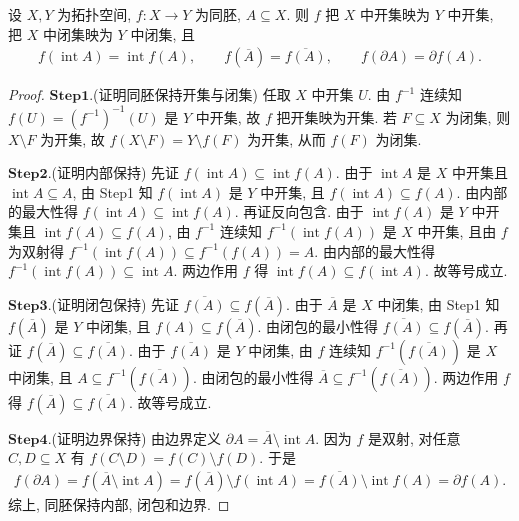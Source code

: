 \documentclass[../../main.tex]{subfiles}%
\begin{document}
\begin{theorem}\label{theorem:同胚保持集合内点闭包边界}
设 \(X,Y\) 为拓扑空间, \(f:X\to Y\) 为同胚, \(A\subseteq X\). 则 \(f\) 把 \(X\) 中开集映为 \(Y\) 中开集, 把 \(X\) 中闭集映为 \(Y\) 中闭集, 且
\begin{align*}
f(\operatorname{int}A)=\operatorname{int}f(A),\qquad
f(\overline A)=\overline{f(A)},\qquad
f(\partial A)=\partial f(A).
\end{align*}
\end{theorem}
\begin{proof}
\noindent$\mathbf{Step}\bm{1}.${\heiti (证明同胚保持开集与闭集)}
任取 \(X\) 中开集 \(U\). 由 \(f^{-1}\) 连续知 \(f(U)=(f^{-1})^{-1}(U)\) 是 \(Y\) 中开集, 故 \(f\) 把开集映为开集. 若 \(F\subseteq X\) 为闭集, 则 \(X\setminus F\) 为开集, 故 \(f(X\setminus F)=Y\setminus f(F)\) 为开集, 从而 \(f(F)\) 为闭集.

\noindent$\mathbf{Step}\bm{2}.${\heiti (证明内部保持)}
先证 \(f(\operatorname{int}A)\subseteq\operatorname{int}f(A)\). 由于 \(\operatorname{int}A\) 是 \(X\) 中开集且 \(\operatorname{int}A\subseteq A\), 由 Step1 知 \(f(\operatorname{int}A)\) 是 \(Y\) 中开集, 且 \(f(\operatorname{int}A)\subseteq f(A)\). 由内部的最大性得 \(f(\operatorname{int}A)\subseteq\operatorname{int}f(A)\). 再证反向包含. 由于 \(\operatorname{int}f(A)\) 是 \(Y\) 中开集且 \(\operatorname{int}f(A)\subseteq f(A)\), 由 \(f^{-1}\) 连续知 \(f^{-1}(\operatorname{int}f(A))\) 是 \(X\) 中开集, 且由 \(f\) 为双射得 \(f^{-1}(\operatorname{int}f(A))\subseteq f^{-1}(f(A))=A\). 由内部的最大性得 \(f^{-1}(\operatorname{int}f(A))\subseteq\operatorname{int}A\). 两边作用 \(f\) 得 \(\operatorname{int}f(A)\subseteq f(\operatorname{int}A)\). 故等号成立.

\noindent$\mathbf{Step}\bm{3}.${\heiti (证明闭包保持)}
先证 \(\overline{f(A)}\subseteq f(\overline A)\). 由于 \(\overline A\) 是 \(X\) 中闭集, 由 Step1 知 \(f(\overline A)\) 是 \(Y\) 中闭集, 且 \(f(A)\subseteq f(\overline A)\). 由闭包的最小性得 \(\overline{f(A)}\subseteq f(\overline A)\). 再证 \(f(\overline A)\subseteq\overline{f(A)}\). 由于 \(\overline{f(A)}\) 是 \(Y\) 中闭集, 由 \(f\) 连续知 \(f^{-1}(\overline{f(A)})\) 是 \(X\) 中闭集, 且 \(A\subseteq f^{-1}(\overline{f(A)})\). 由闭包的最小性得 \(\overline A\subseteq f^{-1}(\overline{f(A)})\). 两边作用 \(f\) 得 \(f(\overline A)\subseteq\overline{f(A)}\). 故等号成立.

\noindent$\mathbf{Step}\bm{4}.${\heiti (证明边界保持)}
由边界定义 \(\partial A=\overline A\setminus\operatorname{int}A\). 因为 \(f\) 是双射, 对任意 \(C,D\subseteq X\) 有 \(f(C\setminus D)=f(C)\setminus f(D)\). 于是
\begin{align*}
f(\partial A)
=f(\overline A\setminus\operatorname{int}A)
=f(\overline A)\setminus f(\operatorname{int}A)
=\overline{f(A)}\setminus\operatorname{int}f(A)
=\partial f(A).
\end{align*}
综上, 同胚保持内部, 闭包和边界.
\end{proof}
\end{document}
